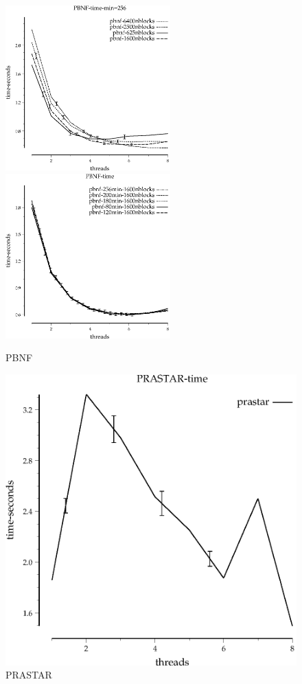 \documentclass{article}
\begin{document}
\begin{figure}
\begin{center}
\includegraphics[width=2.5in]{PBNF-time-min=256}
\includegraphics[width=2.5in]{PBNF-time}
\end{center}
\caption{PBNF}
\end{figure}

\begin{figure}
\begin{center}
\includegraphics{PRASTAR-time}
\end{center}
\caption{PRASTAR}
\end{figure}
\end{document}
